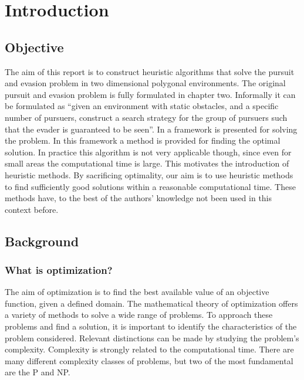 \chapter{Introduction}

\section{Objective}
The aim of this report is to construct heuristic algorithms that solve the pursuit and evasion problem in two dimensional polygonal environments. The original pursuit and evasion problem is fully formulated in chapter two. Informally it can be formulated as ``given an environment with static obstacles, and a specific number of pursuers, construct a search strategy for the group of pursuers such that the evader is guaranteed to be seen''. In \cite{paper3} a framework is presented for solving the problem. In this framework a method is provided for finding the optimal solution. In practice this algorithm is not very applicable though, since even for small areas the computational time is large. This motivates the introduction of heuristic methods. By sacrificing optimality, our aim is to use heuristic methods to find sufficiently good solutions within a reasonable computational time. These methods have, to the best of the authors' knowledge not been used in this context before.
\section{Background}
\subsection{What is optimization?}
The aim of optimization is to find the best available value of an objective function, given a defined domain. %
The mathematical theory of optimization offers a variety of methods to solve a wide range of problems. To approach these problems and find a solution, it is important to identify the characteristics of the problem considered. Relevant distinctions can be made by studying the problem's complexity. Complexity is strongly related to the computational time. There are many different complexity classes of problems, but two of the most fundamental are the P and NP.

